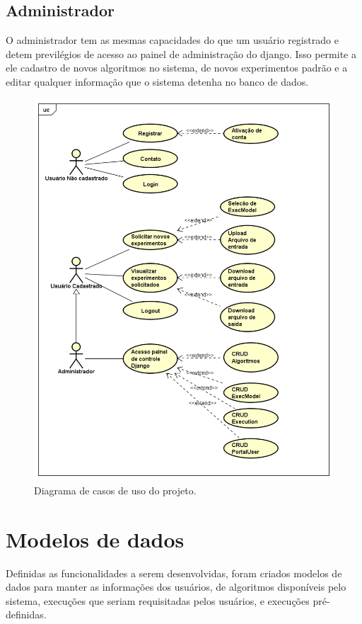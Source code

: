 \documentclass[tg]{mdtufsm}
\begin{document}
\subsection{Administrador}
O administrador tem as mesmas capacidades do que um usuário registrado e detem previlégios de acesso ao painel de administração do django. Isso permite a ele cadastro de novos algoritmos no sistema, de novos experimentos padrão e a editar qualquer informação que o sistema detenha no banco de dados.
\begin{figure}
	\centering
	\includegraphics[width=1\textwidth]{UseCase_tg}
	\caption{
		Diagrama de casos de uso do projeto.
	}
	\label{fig:usecase}
\end{figure}
\section{Modelos de dados}
Definidas as funcionalidades a serem desenvolvidas, foram criados modelos de dados para manter as informações dos usuários, de algoritmos disponíveis pelo sistema, execuções que seriam requisitadas pelos usuários, e execuções pré-definidas.
\end{document}
